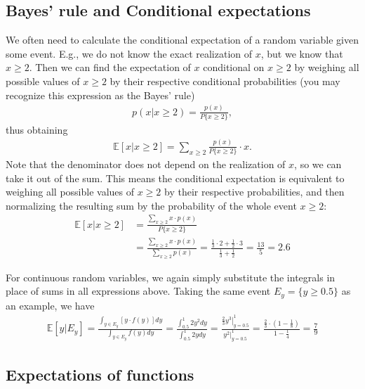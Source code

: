 \documentclass{article}
\begin{document}
\subsection{Bayes' rule and Conditional expectations}

We often need to calculate the conditional expectation of a random variable given some event. E.g., we do not know the exact realization of $x$, but we know that $x \geq 2$. Then we can find the expectation of $x$ conditional on $x \geq 2$ by weighing all possible values of $x \geq 2$ by their respective conditional probabilities (you may recognize this expression as the Bayes' rule)
\begin{align*}
	p(x|x\geq 2) = \frac{p(x)}{P\{x \geq 2\}},
\end{align*}
thus obtaining 
\begin{align*}
	\mathbb{E}[x|x\geq 2] = \sum_{x\geq 2} \frac{p(x)}{P\{x\geq 2\}} \cdot x.
\end{align*}
Note that the denominator does not depend on the realization of $x$, so we can take it out of the sum. This means the conditional expectation is equivalent to weighing all possible values of $x \geq 2$ by their respective probabilities, and then normalizing the resulting sum by the probability of the whole event $x \geq 2$:
\begin{align*}
	\mathbb{E}[x|x\geq 2] &= \frac{\sum_{x\geq 2} x \cdot p(x)}{P\{x\geq 2\}} 
	\\
	&= \frac{\sum_{x\geq 2} x \cdot p(x)}{\sum_{x\geq 2} p(x)} = \frac{\frac{1}{3}\cdot 2 + \frac{1}{2} \cdot 3}{\frac{1}{3} + \frac{1}{2}} = \frac{13}{5} = 2.6
\end{align*}

For continuous random variables, we again simply substitute the integrals in place of sums in all expressions above. Taking the same event $E_y = \{y \geq 0.5\}$ as an example, we have
\begin{align*}
	\mathbb{E}[y|E_y] 
	= \frac{\int_{y \in E_y} \left[y \cdot f(y)\right] dy}{\int_{y \in E_y} f(y) dy} 
	= \frac{\int_{0.5}^1 2y^2 dy}{\int_{0.5}^1 2y dy} 
	= \frac{\left.\frac{2}{3} y^3\right|_{y=0.5}^1}{y^2|_{y=0.5}^1} 
	= \frac{\frac{2}{3}\cdot \left(1-\frac{1}{8}\right)}{1-\frac{1}{4}}
	= \frac{7}{9}
\end{align*}


\subsection{Expectations of functions}
\end{document}
